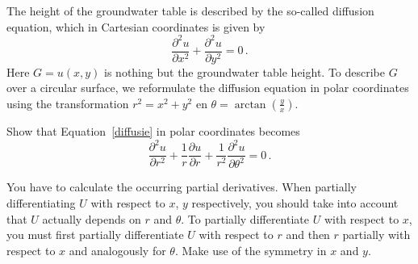 \begin{Exercise} %
The height of the groundwater table is described by the so-called diffusion equation, which in Cartesian coordinates is given by
\begin{equation}
\dfrac{\partial^2u}{\partial x^2}+\dfrac{\partial^2u}{\partial y^2}=0\,.
\label{diffusie}
\end{equation}
Here $G=u(x,y)$ is nothing but the groundwater table height. To describe $G$ over a circular surface, we reformulate the diffusion equation in polar coordinates using the transformation $r^2=x^2+y^2$ en $\theta=\arctan\left(\frac{y}{x}\right)$.

Show that Equation~\eqref{diffusie} in polar coordinates becomes
$$
\dfrac{\partial^2u}{\partial r^2}+\dfrac{1}{r}\dfrac{\partial u}{\partial r}+\dfrac{1}{r^2}\dfrac{\partial^2 u}{\partial \theta^2}=0\,.
$$
\end{Exercise} 

\begin{Answer}\phantom{}
You have to calculate the occurring partial derivatives. When partially differentiating $U$ with respect to $x$, $y$ respectively, you should take into account that $U$ actually depends on $r$ and $\theta$. To partially differentiate $U$ with respect to $x$, you must first partially differentiate $U$ with respect to $r$ and then $r$ partially with respect to $x$ and analogously for $\theta$. Make use of the symmetry in $x$ and $y$.
\end{Answer}


